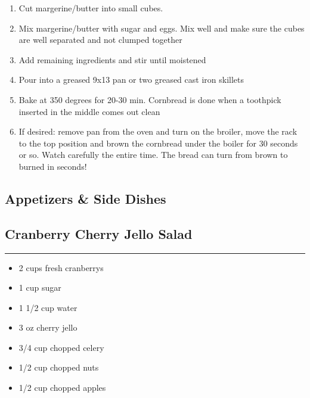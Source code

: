 \documentclass{article}
\begin{document}
\begin{enumerate}
    \item 
        Cut margerine/butter into small cubes.
    \item 
        Mix margerine/butter with sugar and eggs. Mix well and make sure the cubes are well separated and not clumped together
    \item 
        Add remaining ingredients and stir until moistened
    \item 
        Pour into a greased 9x13 pan or two greased cast iron skillets
    \item 
        Bake at 350 degrees for 20-30 min. Cornbread is done when a toothpick inserted in the middle comes out clean
    \item 
        If desired: remove pan from the oven and turn on the broiler, move the rack to the top position and brown the cornbread under the boiler for 30 seconds or so.  Watch carefully the entire time.  The bread can turn from brown to burned in seconds!
\end{enumerate}
\newpage

\vspace*{\fill}
\begin{center}
    \section{Appetizers \& Side Dishes}
\end{center}
\vspace*{\fill}
\newpage

\subsection{Cranberry Cherry Jello Salad} 
\noindent\rule[0.5ex]{\linewidth}{1pt}

\begin{framed}
    \begin{itemize}
        \item 2 cups fresh cranberrys
        \item 1 cup sugar
        \item 1 1/2 cup water
        \item 3 oz cherry jello 
        \item 3/4 cup chopped celery 
        \item 1/2 cup chopped nuts 
        \item 1/2 cup chopped apples
    \end{itemize}
\end{framed}
\end{document}
